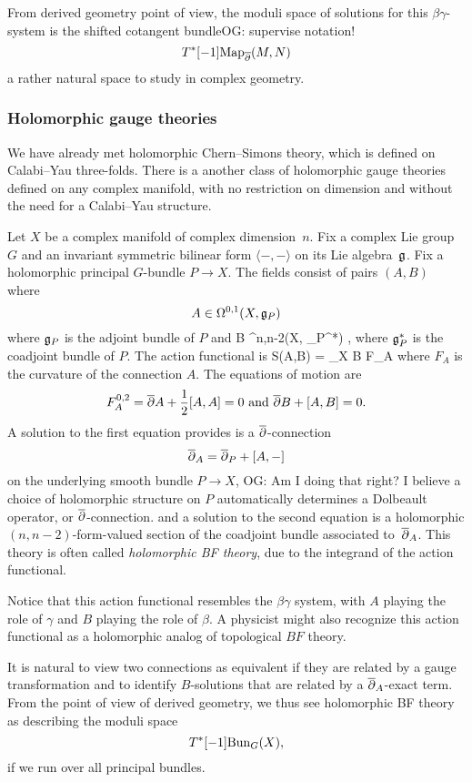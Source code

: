 \documentclass[11pt]{amsart}
\def\owen#1{{\textcolor{violet!50!black}{OG: {#1}}}}
\begin{document}
From derived geometry point of view, the moduli space of solutions for this $\beta\gamma$-system is the shifted cotangent bundle\owen{supervise notation!}
\[
T^*[-1] {\rm Map}_{\overline{\partial}}(M,N) 
\]
a rather natural space to study in complex geometry.

\subsubsection{Holomorphic gauge theories}
\label{sec: hol BF dfn}

We have already met holomorphic Chern--Simons theory, which is defined on Calabi--Yau three-folds.
There is a another class of holomorphic gauge theories 
defined on any complex manifold, with no restriction on dimension 
and without the need for a Calabi--Yau structure. 

Let $X$ be a complex manifold of complex dimension~$n$.
Fix a complex Lie group $G$ and an invariant symmetric bilinear form $\langle-,-\rangle$ on its Lie algebra~$\mathfrak g$.
Fix a holomorphic principal $G$-bundle $P \to X$.
The fields consist of pairs $(A,B)$ where 
\[
A \in \Omega^{0,1}(X, \mathfrak g_P)
\] 
where $\mathfrak g_P$ is the adjoint bundle of $P$ and
\beqn
B \in \Omega^{n,n-2}(X, \fg_P^*) ,
\eeqn
where $\mathfrak g_P^*$ is the coadjoint bundle of $P$. 
The action functional is 
\beqn
S(A,B) = \int_X \langle B \wedge F_A \rangle
\eeqn
where $F_A$ is the curvature of the connection $A$.
The equations of motion are
\[
F_A^{0,2} = {\overline{\partial}} A + \frac12 [A,A] = 0 \text{ and } {\overline{\partial}} B + [A,B] = 0.
\]
A solution to the first equation provides is a ${\overline{\partial}}$-connection 
\[
{\overline{\partial}}_A = {\overline{\partial}}_P + [A,-]
\]
on the underlying smooth bundle $P\to X$, 
\owen{Am I doing that right? I believe a choice of holomorphic structure on $P$ automatically determines a Dolbeault operator, or ${\overline{\partial}}$-connection.}
and a solution to the second equation is a holomorphic $(n,n-2)$-form-valued section of the coadjoint bundle associated to~${\overline{\partial}}_A$.
This theory is often called {\em holomorphic BF theory}, due to the integrand of the action functional.

\begin{rmk}
Notice that this action functional resembles the $\beta\gamma$ system, 
with $A$ playing the role of $\gamma$ and $B$ playing the role of $\beta$.
A physicist might also recognize this action functional as a holomorphic analog of topological $BF$ theory. 
\end{rmk}

It is natural to view two connections as equivalent if they are related by a gauge transformation
and to identify $B$-solutions that are related by a ${\overline{\partial}}_A$-exact term.
From the point of view of derived geometry,
we thus see holomorphic BF theory as describing the moduli space
\[
T^*[-1] {\rm Bun}_G(X),
\]
if we run over all principal bundles.
\end{document}
